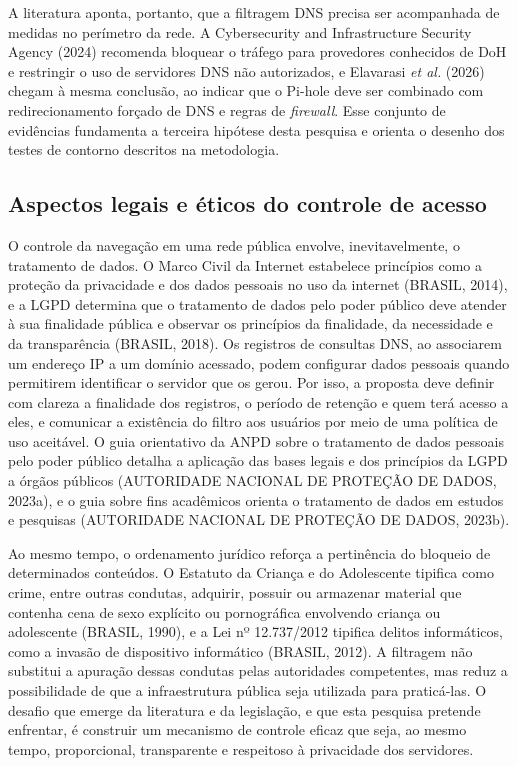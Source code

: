 \documentclass[12pt,a4paper]{article}
\begin{document}
A literatura aponta, portanto, que a filtragem DNS precisa ser acompanhada de medidas no perímetro da rede. A Cybersecurity and Infrastructure Security Agency (2024) recomenda bloquear o tráfego para provedores conhecidos de DoH e restringir o uso de servidores DNS não autorizados, e Elavarasi \textit{et al.} (2026) chegam à mesma conclusão, ao indicar que o Pi-hole deve ser combinado com redirecionamento forçado de DNS e regras de \textit{firewall}. Esse conjunto de evidências fundamenta a terceira hipótese desta pesquisa e orienta o desenho dos testes de contorno descritos na metodologia.

\subsection{Aspectos legais e éticos do controle de acesso}
O controle da navegação em uma rede pública envolve, inevitavelmente, o tratamento de dados. O Marco Civil da Internet estabelece princípios como a proteção da privacidade e dos dados pessoais no uso da internet (BRASIL, 2014), e a LGPD determina que o tratamento de dados pelo poder público deve atender à sua finalidade pública e observar os princípios da finalidade, da necessidade e da transparência (BRASIL, 2018). Os registros de consultas DNS, ao associarem um endereço IP a um domínio acessado, podem configurar dados pessoais quando permitirem identificar o servidor que os gerou. Por isso, a proposta deve definir com clareza a finalidade dos registros, o período de retenção e quem terá acesso a eles, e comunicar a existência do filtro aos usuários por meio de uma política de uso aceitável. O guia orientativo da ANPD sobre o tratamento de dados pessoais pelo poder público detalha a aplicação das bases legais e dos princípios da LGPD a órgãos públicos (AUTORIDADE NACIONAL DE PROTEÇÃO DE DADOS, 2023a), e o guia sobre fins acadêmicos orienta o tratamento de dados em estudos e pesquisas (AUTORIDADE NACIONAL DE PROTEÇÃO DE DADOS, 2023b).

Ao mesmo tempo, o ordenamento jurídico reforça a pertinência do bloqueio de determinados conteúdos. O Estatuto da Criança e do Adolescente tipifica como crime, entre outras condutas, adquirir, possuir ou armazenar material que contenha cena de sexo explícito ou pornográfica envolvendo criança ou adolescente (BRASIL, 1990), e a Lei nº 12.737/2012 tipifica delitos informáticos, como a invasão de dispositivo informático (BRASIL, 2012). A filtragem não substitui a apuração dessas condutas pelas autoridades competentes, mas reduz a possibilidade de que a infraestrutura pública seja utilizada para praticá-las. O desafio que emerge da literatura e da legislação, e que esta pesquisa pretende enfrentar, é construir um mecanismo de controle eficaz que seja, ao mesmo tempo, proporcional, transparente e respeitoso à privacidade dos servidores.
\end{document}

